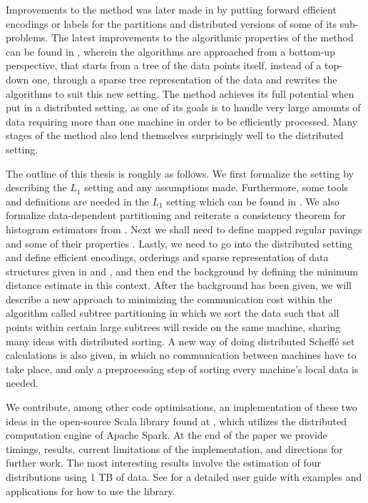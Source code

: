 \documentclass{report}
\begin{document}
Improvements to the method was later made in \cite{Scalable Multivariate Histograms} by putting forward efficient encodings or labels for the partitions and distributed versions of some of its sub-problems. 
The latest improvements to the algorithmic properties of the method
can be found in \cite{Scalable Algorithms},  wherein the algorithms are approached
from a bottom-up perspective, that starts from a tree of the data points itself, instead of a top-down one, through a
sparse tree representation of the data and
rewrites the algorithms to suit this new setting. The method achieves its full potential when put in a distributed setting, as one of its goals is to handle very large amounts of data requiring 
more than one machine in order to be efficiently processed. Many stages of the method also lend themselves surprisingly well to the distributed setting.

The outline of this thesis is roughly as follows. We first formalize the setting by describing the $L_1$ setting and any assumptions made. 
Furthermore, some tools and definitions are needed in the $L_1$ setting which can be found in \cite{CMDE}. We also formalize data-dependent partitioning
and reiterate a consistency theorem for histogram estimators from \cite{Consistency}. Next we shall need to define mapped regular pavings
and some of their properties \cite{Mapped Regular Pavings}. Lastly, we need to go into the distributed setting and define efficient encodings, orderings and sparse representation of data structures given in
\cite{Scalable Multivariate Histograms} and \cite{Scalable Algorithms}, and then end the background by defining the minimum distance estimate in this context.
After the background has been given, we will describe a new approach to minimizing the communication cost within the algorithm called subtree partitioning in which we sort the data such that all points within certain
large subtrees will reside on the same machine, sharing many ideas with distributed sorting. 
A new way of doing distributed Scheffé set calculations is also given, in which no communication between machines
have to take place, and only a preprocessing step of sorting every machine's local data is needed.

We contribute, among other code optimisations, an implementation of these two ideas in the open-source Scala library found at \cite{SparkDensityTree}, which utilizes the distributed computation engine of Apache Spark.
At the end of the paper we provide timings, results, current limitations of the implementation, and directions for further work. The most interesting results involve the estimation of four distributions using 1 TB of data. See \cite{SparkDensityTreeExamples} for a detailed user guide with examples and applications
for how to use the library.
\end{document}

